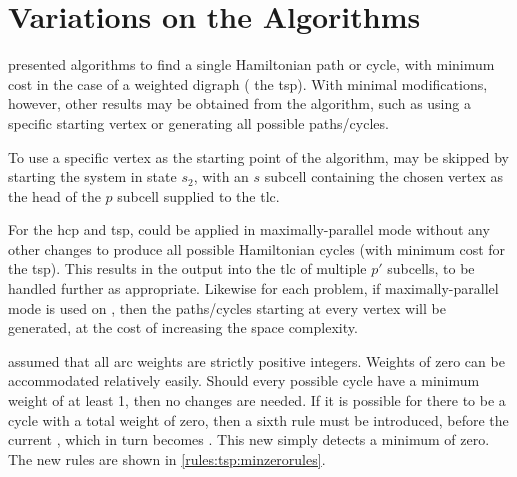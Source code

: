 \section{\label{sec:tsp:variations}Variations on the Algorithms}
 presented algorithms to find a single Hamiltonian path or cycle, with minimum cost in the case of a weighted digraph (\ie{} the \gls{tsp}).  With minimal modifications, however, other results may be obtained from the algorithm, such as using a specific starting vertex or generating all possible paths/cycles.

To use a specific vertex as the starting point of the algorithm,  may be skipped by starting the system in state \(s_2\), with an \(s\) subcell containing the chosen vertex as the head of the \(p\) subcell supplied to the \gls{tlc}.


For the \gls{hcp} and \gls{tsp},  could be applied in maximally-parallel mode without any other changes to produce all possible Hamiltonian cycles (with minimum cost for the \gls{tsp}).  This results in the output into the \gls{tlc} of multiple \(p'\) subcells, to be handled further as appropriate.  Likewise for each problem, if maximally-parallel mode is used on , then the paths/cycles starting at every vertex will be generated, at the cost of increasing the space complexity.

 assumed that all arc weights are strictly positive integers.  Weights of zero can be accommodated relatively easily.  Should every possible cycle have a minimum weight of at least 1, then no changes are needed.  If it is possible for there to be a cycle with a total weight of zero, then a sixth rule must be introduced, before the current , which in turn becomes .  This new  simply detects a minimum of zero.  The new rules are shown in \cref{rules:tsp:minzerorules}.

